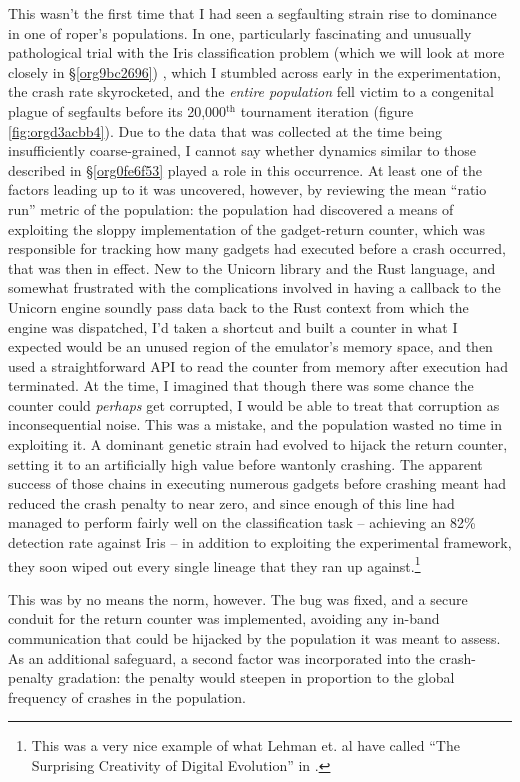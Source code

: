 \documentclass[12pt,glossary]{dalthesis}
\begin{document}
This wasn't the first time that I had seen a segfaulting strain rise to
dominance in one of \gls{roper}'s populations. In one, particularly fascinating
and unusually pathological trial with the Iris classification problem (which we
will look at more closely in \S \ref{org9bc2696}) , which I stumbled
across early in the experimentation, the crash rate skyrocketed, and the \emph{entire
population} fell victim to a congenital plague of segfaults before its
20,000\(^{\text{th}}\) tournament iteration (figure \ref{fig:orgd3acbb4}). Due to the data that
was collected at the time being insufficiently coarse-grained, I cannot say
whether dynamics similar to those described in \S \ref{org0fe6f53} played
a role in this occurrence. At least one of the factors leading up to it was
uncovered, however, by reviewing the mean ``ratio run'' metric of the population:
the population had discovered a means of exploiting the sloppy implementation of
the gadget-return counter, which was responsible for tracking how many gadgets
had executed before a crash occurred, that was then in effect. New to the
Unicorn library and the Rust language, and somewhat frustrated with the
complications involved in having a callback to the Unicorn engine soundly pass
data back to the Rust context from which the engine was dispatched, I'd taken a
shortcut and built a counter in what I expected would be an unused region of the
emulator's memory space, and then used a straightforward API to read the counter
from memory after execution had terminated. At the time, I imagined that though
there was some chance the counter could \emph{perhaps} get corrupted, I would be able
to treat that corruption as inconsequential noise. This was a mistake, and the
population wasted no time in exploiting it. A dominant genetic strain had
evolved to hijack the return counter, setting it to an artificially high value
before wantonly crashing. The apparent success of those chains in executing
numerous gadgets before crashing meant had reduced the crash penalty to near
zero, and since enough of this line had managed to perform fairly well on the
classification task -- achieving an 82\% detection rate against Iris -- in
addition to exploiting the experimental framework, they soon wiped out every
single lineage that they ran up against.\footnote{This was a very nice example of
what Lehman et. al have called ``The Surprising Creativity of Digital Evolution''
in \cite{lehman18}.}

This was by no means the norm, however. The bug was fixed, and a secure conduit
for the return counter was implemented, avoiding any in-band communication that
could be hijacked by the population it was meant to assess. As an additional
safeguard, a second factor was incorporated into the crash-penalty gradation:
the penalty would steepen in proportion to the global frequency of crashes in
the population. 
\end{document}
